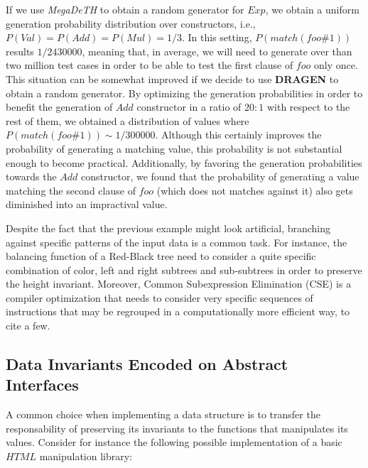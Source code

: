 \documentclass[conference]{IEEEtran}
\newcommand{\Conid}[1]{\mathit{#1}}
\newcommand{\Varid}[1]{\mathit{#1}}
\newcommand{\megadeth}{\emph{MegaDeTH}\xspace}
\newcommand{\dragen}{\textbf{DRAGEN}\xspace}
\begin{document}
If we use \megadeth to obtain a random generator for \ensuremath{\Conid{Exp}}, we obtain a uniform
generation probability distribution over constructors, i.e., $P(\ensuremath{\Conid{Val}}) =
P(\ensuremath{\Conid{Add}}) = P(\ensuremath{\Conid{Mul}}) = 1/3$.
%
In this setting, $P(match(foo\#1))$ results $1/2430000$, meaning that, in
average, we will need to generate over than two million test cases in order to
be able to test the first clause of \ensuremath{\Varid{foo}} only once.
%
This situation can be somewhat improved if we decide to use \dragen to obtain a
random generator.
%
By optimizing the generation probabilities in order to benefit the generation of
\ensuremath{\Conid{Add}} constructor in a ratio of $20:1$ with respect to the rest of them, we
obtained a distribution of values where $P(match(foo\#1)) \sim 1/300000$.
%
Although this certainly improves the probability of generating a matching value,
this probability is not substantial enough to become practical.
%
Additionally, by favoring the generation probabilities towards the \ensuremath{\Conid{Add}}
constructor, we found that the probability of generating a value matching the
second clause of \ensuremath{\Varid{foo}} (which does not matches against it) also gets diminished
into an impractival value.


Despite the fact that the previous example might look artificial, branching
against specific patterns of the input data is a common task.
%
For instance, the balancing function of a Red-Black tree need to consider a
quite specific combination of color, left and right subtrees and sub-subtrees
in order to preserve the height invariant.
%
Moreover, Common Subexpression Elimination (CSE) is a compiler optimization that
needs to consider very specific sequences of instructions that may be regrouped
in a computationally more efficient way, to cite a few.



\subsection{\textbf{Data Invariants Encoded on Abstract Interfaces}}

A common choice when implementing a data structure is to transfer the
responsability of preserving its invariants to the functions that manipulates
its values.
%
Consider for instance the following possible implementation of a basic \ensuremath{\Conid{HTML}}
manipulation library:
\end{document}
